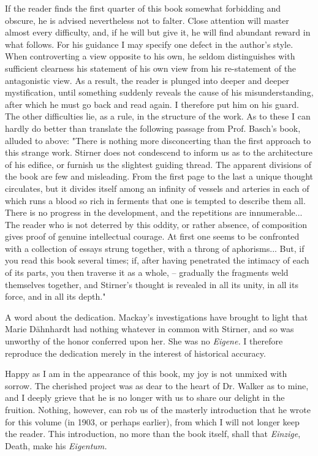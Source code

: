 \documentclass[a4paper]{book}
\begin{document}
If the reader finds the first quarter of this book somewhat forbidding and 
obscure, he is advised nevertheless not to falter. Close attention will master 
almost every difficulty, and, if he will but give it, he will find abundant 
reward in what follows. For his guidance I may specify one defect in the 
author's style. When controverting a view opposite to his own, he seldom 
distinguishes with sufficient clearness his statement of his own view from his 
re-statement of the antagonistic view. As a result, the reader is plunged into 
deeper and deeper mystification, until something suddenly reveals the cause of 
his misunderstanding, after which he must go back and read again. I therefore 
put him on his guard. The other difficulties lie, as a rule, in the structure 
of the work. As to these I can hardly do better than translate the following 
passage from Prof. Basch's book, alluded to above: "{}There is nothing more 
disconcerting than the first approach to this strange work. Stirner does not 
condescend to inform us as to the architecture of his edifice, or furnish us 
the slightest guiding thread. The apparent divisions of the book are few and 
misleading. From the first page to the last a unique thought circulates, but 
it divides itself among an infinity of vessels and arteries in each of which 
runs a blood so rich in ferments that one is tempted to describe them all. 
There is no progress in the development, and the repetitions are 
innumerable... The reader who is not deterred by this oddity, or rather 
absence, of composition gives proof of genuine intellectual courage. At first 
one seems to be confronted with a collection of essays strung together, with a 
throng of aphorisms... But, if you read this book several times; if, after 
having penetrated the intimacy of each of its parts, you then traverse it as a 
whole, -- gradually the fragments weld themselves together, and Stirner's 
thought is revealed in all its unity, in all its force, and in all its 
depth."{}

A word about the dedication. Mackay's investigations have brought to light 
that Marie D\"ahnhardt had nothing whatever in common with Stirner, and so was 
unworthy of the honor conferred upon her. She was no \textit{Eigene.} I 
therefore reproduce the dedication merely in the interest of historical 
accuracy.

Happy as I am in the appearance of this book, my joy is not unmixed with 
sorrow. The cherished project was as dear to the heart of Dr. Walker as to 
mine, and I deeply grieve that he is no longer with us to share our delight in 
the fruition. Nothing, however, can rob us of the masterly introduction that 
he wrote for this volume (in 1903, or perhaps earlier), from which I will not 
longer keep the reader. This introduction, no more than the book itself, shall 
that \textit{Einzige}, Death, make his \textit{Eigentum.}
\end{document}
